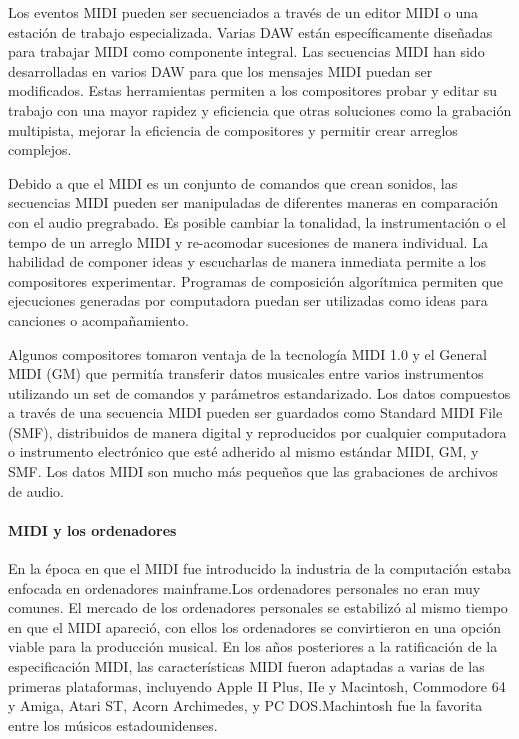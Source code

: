 \documentclass[a4paper,11pt,oneside]{book}
\begin{document}
Los eventos MIDI pueden ser secuenciados a través de un editor MIDI o una estación de trabajo especializada. Varias DAW están específicamente diseñadas para trabajar MIDI como componente integral. Las secuencias MIDI han sido desarrolladas en varios DAW para que los mensajes MIDI puedan ser modificados. Estas herramientas permiten a los compositores probar y editar su trabajo con una mayor rapidez y eficiencia que otras soluciones como la grabación multipista, mejorar la eficiencia de compositores y permitir crear arreglos complejos.

Debido a que el MIDI es un conjunto de comandos que crean sonidos, las secuencias MIDI pueden ser manipuladas de diferentes maneras en comparación con el audio pregrabado. Es posible cambiar la tonalidad, la instrumentación o el tempo de un arreglo MIDI y re-acomodar sucesiones de manera individual. La habilidad de componer ideas y escucharlas de manera inmediata permite a los compositores experimentar. Programas de composición algorítmica permiten que ejecuciones generadas por computadora puedan ser utilizadas como ideas para canciones o acompañamiento.

Algunos compositores tomaron ventaja de la tecnología MIDI 1.0 y el General MIDI (GM) que permitía transferir datos musicales entre varios instrumentos utilizando un set de comandos y parámetros estandarizado. Los datos compuestos a través de una secuencia MIDI pueden ser guardados como Standard MIDI File (SMF), distribuidos de manera digital y reproducidos por cualquier computadora o instrumento electrónico que esté adherido al mismo estándar MIDI, GM, y SMF. Los datos MIDI son mucho más pequeños que las grabaciones de archivos de audio.

\paragraph{MIDI y los ordenadores}



En la época en que el MIDI fue introducido la industria de la computación estaba enfocada en ordenadores mainframe.Los ordenadores personales no eran muy comunes.
El mercado de los ordenadores personales se estabilizó al mismo tiempo en que el MIDI apareció, con ellos los ordenadores se convirtieron en una opción viable para la producción musical. 
En los años posteriores a la ratificación de la especificación MIDI, las características MIDI fueron adaptadas a varias de las primeras plataformas, incluyendo Apple II Plus, IIe y Macintosh, Commodore 64 y Amiga, Atari ST, Acorn Archimedes, y PC DOS.Machintosh fue la favorita entre los músicos estadounidenses.
\end{document}
